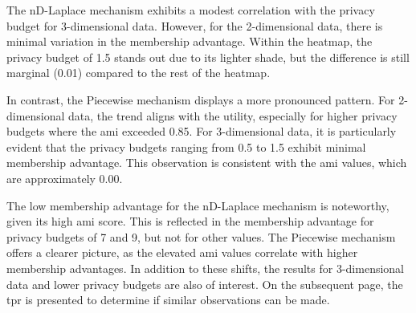 The nD-Laplace mechanism exhibits a modest correlation with the privacy budget for 3-dimensional data. However, for the 2-dimensional data, there is minimal variation in the membership advantage. Within the heatmap, the privacy budget of 1.5 stands out due to its lighter shade, but the difference is still marginal (0.01) compared to the rest of the heatmap.

In contrast, the Piecewise mechanism displays a more pronounced pattern. For 2-dimensional data, the trend aligns with the utility, especially for higher privacy budgets where the \gls{ami} exceeded 0.85. For 3-dimensional data, it is particularly evident that the privacy budgets ranging from 0.5 to 1.5 exhibit minimal membership advantage. This observation is consistent with the \gls{ami} values, which are approximately 0.00.

The low membership advantage for the nD-Laplace mechanism is noteworthy, given its high \gls{ami} score. This is reflected in the membership advantage for privacy budgets of 7 and 9, but not for other values. The Piecewise mechanism offers a clearer picture, as the elevated \gls{ami} values correlate with higher membership advantages. In addition to these shifts, the results for 3-dimensional data and lower privacy budgets are also of interest. On the subsequent page, the \gls{tpr} is presented to determine if similar observations can be made.
\newpage

